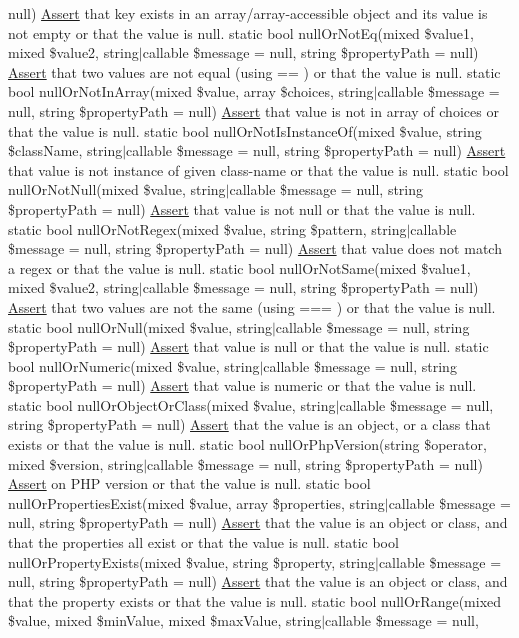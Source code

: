 null) \mbox{\hyperlink{class_assert_1_1_assert}{Assert}} that key exists in an array/array-\/accessible object and its value is not empty or that the value is null.  static bool null\+Or\+Not\+Eq(mixed \$value1, mixed \$value2, string$\vert$callable \$message = null, string \$property\+Path = null) \mbox{\hyperlink{class_assert_1_1_assert}{Assert}} that two values are not equal (using == ) or that the value is null.  static bool null\+Or\+Not\+In\+Array(mixed \$value, array \$choices, string$\vert$callable \$message = null, string \$property\+Path = null) \mbox{\hyperlink{class_assert_1_1_assert}{Assert}} that value is not in array of choices or that the value is null.  static bool null\+Or\+Not\+Is\+Instance\+Of(mixed \$value, string \$class\+Name, string$\vert$callable \$message = null, string \$property\+Path = null) \mbox{\hyperlink{class_assert_1_1_assert}{Assert}} that value is not instance of given class-\/name or that the value is null.  static bool null\+Or\+Not\+Null(mixed \$value, string$\vert$callable \$message = null, string \$property\+Path = null) \mbox{\hyperlink{class_assert_1_1_assert}{Assert}} that value is not null or that the value is null.  static bool null\+Or\+Not\+Regex(mixed \$value, string \$pattern, string$\vert$callable \$message = null, string \$property\+Path = null) \mbox{\hyperlink{class_assert_1_1_assert}{Assert}} that value does not match a regex or that the value is null.  static bool null\+Or\+Not\+Same(mixed \$value1, mixed \$value2, string$\vert$callable \$message = null, string \$property\+Path = null) \mbox{\hyperlink{class_assert_1_1_assert}{Assert}} that two values are not the same (using === ) or that the value is null.  static bool null\+Or\+Null(mixed \$value, string$\vert$callable \$message = null, string \$property\+Path = null) \mbox{\hyperlink{class_assert_1_1_assert}{Assert}} that value is null or that the value is null.  static bool null\+Or\+Numeric(mixed \$value, string$\vert$callable \$message = null, string \$property\+Path = null) \mbox{\hyperlink{class_assert_1_1_assert}{Assert}} that value is numeric or that the value is null.  static bool null\+Or\+Object\+Or\+Class(mixed \$value, string$\vert$callable \$message = null, string \$property\+Path = null) \mbox{\hyperlink{class_assert_1_1_assert}{Assert}} that the value is an object, or a class that exists or that the value is null.  static bool null\+Or\+Php\+Version(string \$operator, mixed \$version, string$\vert$callable \$message = null, string \$property\+Path = null) \mbox{\hyperlink{class_assert_1_1_assert}{Assert}} on P\+HP version or that the value is null.  static bool null\+Or\+Properties\+Exist(mixed \$value, array \$properties, string$\vert$callable \$message = null, string \$property\+Path = null) \mbox{\hyperlink{class_assert_1_1_assert}{Assert}} that the value is an object or class, and that the properties all exist or that the value is null.  static bool null\+Or\+Property\+Exists(mixed \$value, string \$property, string$\vert$callable \$message = null, string \$property\+Path = null) \mbox{\hyperlink{class_assert_1_1_assert}{Assert}} that the value is an object or class, and that the property exists or that the value is null.  static bool null\+Or\+Range(mixed \$value, mixed \$min\+Value, mixed \$max\+Value, string$\vert$callable \$message = null, 